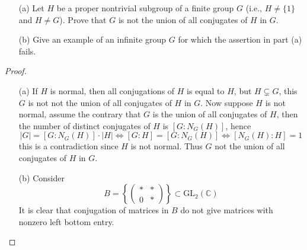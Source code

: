\begin{prob}[S2011-Q1, F2004-Q1]
    \phantom{text}
    \begin{itemize}
    \item[(a)] Let \( H \) be a proper nontrivial subgroup of a finite group \( G \) (i.e., \( H \neq \{1\} \) and \( H \neq G \)).  
    Prove that \( G \) is not the union of all conjugates of \( H \) in \( G \).
    
    \item[(b)] Give an example of an infinite group \( G \) for which the assertion in part (a) fails.
    \end{itemize}
\end{prob}
\begin{proof}
    \begin{itemize}
        \item[(a)] If $H$ is normal, then all conjugations of $H$ is equal to $H$, but $H\subsetneq G$, this $G$ is not not the union of all conjugates of \( H \) in \( G \). Now suppose $H$ is not normal, assume the contrary that $G$ is the union of all conjugates of $H$, then the number of distinct conjugates of $H$ is $[G:N_G(H)]$, hence 
        \begin{equation*}
            |G|=[G:N_G(H)]\cdot|H|\iff [G:H]=[G:N_G(H)]\iff [N_G(H):H]=1
        \end{equation*}
        this is a contradiction since $H$ is not normal. Thus $G$ not the union of all conjugates of \( H \) in \( G \).
        \item[(b)] Consider 
        \begin{equation*}
            B=\left\{\begin{pmatrix}
                *&*\\
                0&*
            \end{pmatrix}\right\}\subset \text{GL}_2(\mathbb{C})
        \end{equation*}
        It is clear that conjugation of matrices in $B$ do not give matrices with nonzero left bottom entry.
    \end{itemize}
\end{proof}

